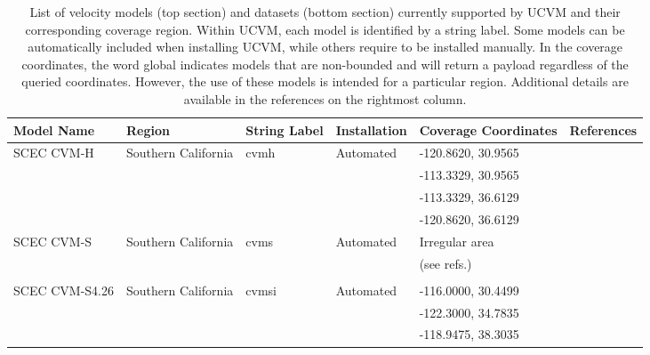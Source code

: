 
\begin{table*}[ht!]
\centering
\small
\caption{List of velocity models (top section) and datasets (bottom section) currently supported by UCVM and their corresponding coverage region. Within UCVM, each model is identified by a string label. Some models can be automatically included when installing UCVM, while others require to be installed manually. In the coverage coordinates, the word global indicates models that are non-bounded and will return a payload regardless of the queried coordinates. However, the use of these models is intended for a particular region. Additional details are available in the references on the rightmost column.}
\begin{tabular}[]{lllllp{1.25in}}
Model Name         & Region                & String Label & Installation & Coverage Coordinates & References \\
\hline
SCEC CVM-H         & Southern California   & cvmh          &  Automated   & -120.8620, 30.9565 & \citet{Suss_2003_JGR}        \\
                   &                       &               &              & -113.3329, 30.9565 & \citet{Plesch_2011_SCEC}     \\
                   &                       &               &              & -113.3329, 36.6129 & \citet{CVM-H_Manual}         \\
                   &                       &               &              & -120.8620, 36.6129 &                              \\ 
SCEC CVM-S         & Southern California   & cvms          &  Automated   & Irregular area     & \citet{Magistrale_1996_BSSA} \\
                   &                       &               &              & (see refs.)        & \citet{Magistrale_2000_BSSA} \\
                   &                       &               &              &                    & \citet{Kohler_2003_BSSA}     \\
SCEC CVM-S4.26     & Southern California   & cvmsi         &  Automated   & -116.0000, 30.4499 & \citet{Chen_2011_Proc}       \\
                   &                       &               &              & -122.3000, 34.7835 & \citet{Lee_2014_JGR}         \\
                   &                       &               &              & -118.9475, 38.3035 & \citet{Lee_2014_SRL}         \\

\end{tabular}
\end{table*}
